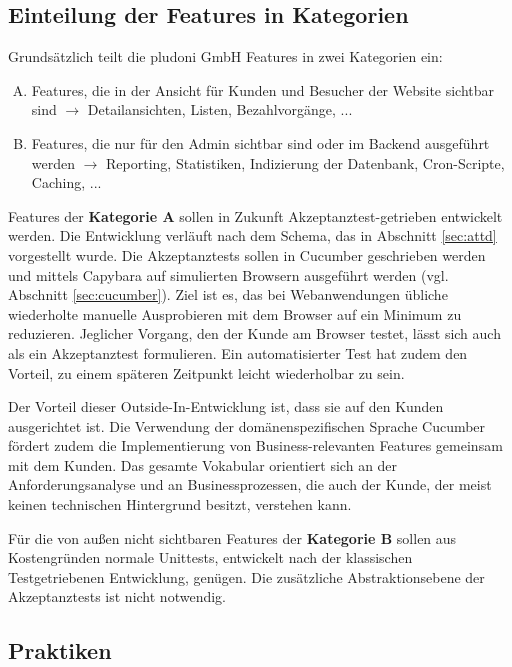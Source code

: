 \subsection{Einteilung der Features in Kategorien}
Grundsätzlich teilt die pludoni GmbH Features in zwei Kategorien ein:

\begin{enumerate}[A.]

 \item Features, die in der Ansicht für Kunden und Besucher der Website sichtbar sind $\to$ Detailansichten, Listen, Bezahlvorgänge, ...
 \item Features, die nur für den Admin sichtbar sind oder im Backend ausgeführt werden $\to$ Reporting, Statistiken, Indizierung der Datenbank, Cron-Scripte, Caching, ...
\end{enumerate}

Features der \textbf{Kategorie A} sollen in Zukunft Akzeptanztest-getrieben entwickelt werden. Die Entwicklung verläuft nach dem Schema, das in Abschnitt \ref{sec:attd} vorgestellt wurde. Die Akzeptanztests sollen in Cucumber geschrieben werden und mittels Capybara auf simulierten Browsern ausgeführt werden (vgl. Abschnitt \ref{sec:cucumber}).
Ziel ist es, das bei Webanwendungen übliche wiederholte manuelle Ausprobieren mit dem Browser auf ein Minimum zu reduzieren. Jeglicher Vorgang, den der Kunde am Browser testet, lässt sich auch als ein Akzeptanztest formulieren. Ein automatisierter Test hat zudem den Vorteil, zu einem späteren Zeitpunkt leicht wiederholbar zu sein.

Der Vorteil dieser Outside-In-Entwicklung ist, dass sie auf den Kunden ausgerichtet ist. Die Verwendung der domänenspezifischen Sprache Cucumber fördert zudem die Implementierung von Business-relevanten Features gemeinsam mit dem Kunden. Das gesamte Vokabular orientiert sich an der Anforderungsanalyse und an Businessprozessen, die auch der Kunde, der meist keinen technischen Hintergrund besitzt, verstehen kann.

Für die von außen nicht sichtbaren Features der \textbf{Kategorie B} sollen aus Kostengründen normale Unittests, entwickelt nach der klassischen Testgetriebenen Entwicklung, genügen. Die zusätzliche Abstraktionsebene der Akzeptanztests ist nicht notwendig.

\subsection{Praktiken}
\label{sec:auswahlWeitere}

